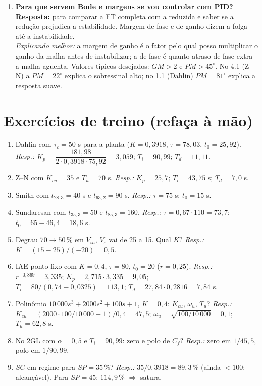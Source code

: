 \documentclass[11pt,a4paper]{article}
\newcommand{\Vin}{V_{in}}
\begin{document}
\begin{enumerate}[leftmargin=*]
\emph{Explicando melhor:} na analogia, $C_v=1/R$. A válvula $R_4$ tem $C_v=14{,}97$; 50\,\% de abertura $\Rightarrow$ $C_v=7{,}49$ $\Rightarrow$ $R_p=1/7{,}49=133{,}6$ k$\Omega$ (na escala adotada). Ligá-lo drena corrente do nó 3: o ganho cai de 0{,}397 para 0{,}305 e o controlador precisa subir o SC de 62{,}9 para 81{,}9\,\% para manter a VP em 25\,\%.
\item \textbf{Para que servem Bode e margens se vou controlar com PID?}\\
\textbf{Resposta:} para comparar a FT completa com a reduzida e saber se a redução prejudica a estabilidade. Margem de fase e de ganho dizem a folga até a instabilidade.\\
\emph{Explicando melhor:} a margem de ganho é o fator pelo qual posso multiplicar o ganho da malha antes de instabilizar; a de fase é quanto atraso de fase extra a malha aguenta. Valores típicos desejados: $GM>2$ e $PM>45^\circ$. No 4.1 (Z--N) a $PM=22^\circ$ explica o sobressinal alto; no 1.1 (Dahlin) $PM=81^\circ$ explica a resposta suave.
\end{enumerate}

\section{Exercícios de treino (refaça à mão)}\label{exerc}
\begin{enumerate}[leftmargin=*]
\item Dahlin com $\tau_c=50$ s para a planta ($K=0{,}3918$, $\tau=78{,}03$, $t_0=25{,}92$). \emph{Resp.:} $K_p=\dfrac{181{,}98}{2\cdot0{,}3918\cdot75{,}92}=3{,}059$; $T_i=90{,}99$; $T_d=11{,}11$.
\item Z--N com $K_{cu}=35$ e $T_u=70$ s. \emph{Resp.:} $K_p=25{,}7$; $T_i=43{,}75$ s; $T_d=7{,}0$ s.
\item Smith com $t_{28,3}=40$ s e $t_{63,2}=90$ s. \emph{Resp.:} $\tau=75$ s; $t_0=15$ s.
\item Sundaresan com $t_{35,3}=50$ e $t_{85,3}=160$. \emph{Resp.:} $\tau=0{,}67\cdot110=73{,}7$; $t_0=65-46{,}4=18{,}6$ s.
\item Degrau $70\to50\,\%$ em $\Vin$, $V_c$ vai de 25 a 15. Qual $K$? \emph{Resp.:} $K=(15-25)/(-20)=0{,}5$.
\item IAE ponto fixo com $K=0{,}4$, $\tau=80$, $t_0=20$ ($r=0{,}25$). \emph{Resp.:} $r^{-0{,}869}=3{,}335$; $K_p=2{,}715\cdot3{,}335=9{,}05$; $T_i=80/(0{,}74-0{,}0325)=113{,}1$; $T_d=27{,}84\cdot0{,}2816=7{,}84$ s.
\item Polinômio $10\,000s^3+2000s^2+100s+1$, $K=0{,}4$: $K_{cu}$, $\omega_u$, $T_u$? \emph{Resp.:} $K_{cu}=(2000\cdot100/10\,000-1)/0{,}4=47{,}5$; $\omega_u=\sqrt{100/10\,000}=0{,}1$; $T_u=62{,}8$ s.
\item No 2GL com $\alpha=0{,}5$ e $T_i=90{,}99$: zero e polo de $C_f$? \emph{Resp.:} zero em $1/45{,}5$, polo em $1/90{,}99$.
\item $SC$ em regime para $SP=35\,\%$? \emph{Resp.:} $35/0{,}3918=89{,}3\,\%$ (ainda $<100$: alcançável). Para $SP=45$: $114{,}9\,\%$ $\Rightarrow$ satura.
\end{enumerate}
\end{document}

